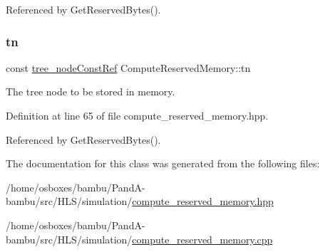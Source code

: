 Referenced by Get\+Reserved\+Bytes().

\mbox{\label{classComputeReservedMemory_abbd1c91f8c511b663f8a9e5816e70153}} 
\subsubsection{\texorpdfstring{tn}{tn}}
{\footnotesize\ttfamily const \hyperlink{tree__node_8hpp_a3cf5d02292c940f3892425a5b5fdec3c}{tree\+\_\+node\+Const\+Ref} Compute\+Reserved\+Memory\+::tn\hspace{0.3cm}{\ttfamily [private]}}



The tree node to be stored in memory. 



Definition at line 65 of file compute\+\_\+reserved\+\_\+memory.\+hpp.



Referenced by Get\+Reserved\+Bytes().



The documentation for this class was generated from the following files\+:\begin{DoxyCompactItemize}
\item 
/home/osboxes/bambu/\+Pand\+A-\/bambu/src/\+H\+L\+S/simulation/\hyperlink{compute__reserved__memory_8hpp}{compute\+\_\+reserved\+\_\+memory.\+hpp}\item 
/home/osboxes/bambu/\+Pand\+A-\/bambu/src/\+H\+L\+S/simulation/\hyperlink{compute__reserved__memory_8cpp}{compute\+\_\+reserved\+\_\+memory.\+cpp}\end{DoxyCompactItemize}
